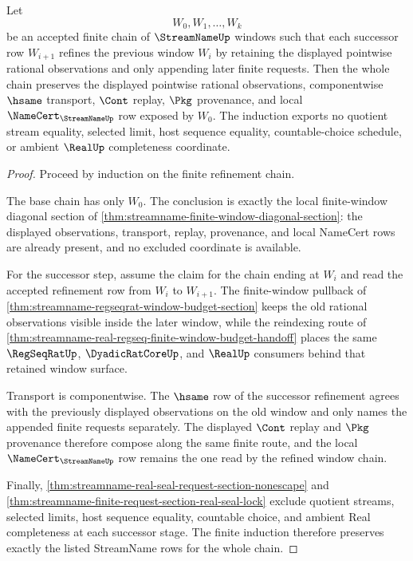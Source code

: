 \begin{theorem}
\label{thm:streamname-finite-window-nested-refinement-induction}
Let
$$
W_0,W_1,\ldots,W_k
$$
be an accepted finite chain of $\StreamNameUp$ windows such that each successor row $W_{i+1}$ refines the previous window $W_i$ by retaining the displayed pointwise rational observations and only appending later finite requests. Then the whole chain preserves the displayed pointwise rational observations, componentwise $\hsame$ transport, $\Cont$ replay, $\Pkg$ provenance, and local $\NameCert_{\StreamNameUp}$ row exposed by $W_0$. The induction exports no quotient stream equality, selected limit, host sequence equality, countable-choice schedule, or ambient $\RealUp$ completeness coordinate.
\end{theorem}
\begin{proof}
Proceed by induction on the finite refinement chain.

The base chain has only $W_0$. The conclusion is exactly the local finite-window diagonal section of \autoref{thm:streamname-finite-window-diagonal-section}: the displayed observations, transport, replay, provenance, and local NameCert rows are already present, and no excluded coordinate is available.

For the successor step, assume the claim for the chain ending at $W_i$ and read the accepted refinement row from $W_i$ to $W_{i+1}$. The finite-window pullback of \autoref{thm:streamname-regseqrat-window-budget-section} keeps the old rational observations visible inside the later window, while the reindexing route of \autoref{thm:streamname-real-regseq-finite-window-budget-handoff} places the same $\RegSeqRatUp$, $\DyadicRatCoreUp$, and $\RealUp$ consumers behind that retained window surface.

Transport is componentwise. The $\hsame$ row of the successor refinement agrees with the previously displayed observations on the old window and only names the appended finite requests separately. The displayed $\Cont$ replay and $\Pkg$ provenance therefore compose along the same finite route, and the local $\NameCert_{\StreamNameUp}$ row remains the one read by the refined window chain.

Finally, \autoref{thm:streamname-real-seal-request-section-nonescape} and \autoref{thm:streamname-finite-request-section-real-seal-lock} exclude quotient streams, selected limits, host sequence equality, countable choice, and ambient Real completeness at each successor stage. The finite induction therefore preserves exactly the listed StreamName rows for the whole chain.
\end{proof}
